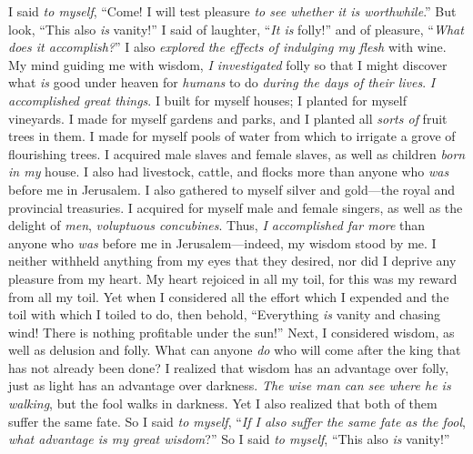\begin{biblechapter} %
 I said \textit{to myself}, “Come! I will test pleasure \textit{to see whether it is worthwhile}.” But look, “This also \textit{is} vanity!”
\verse I said of laughter, “\textit{It is} folly!” and of pleasure, “\textit{What does it accomplish?}”
\verse I also \textit{explored} \textit{the effects of indulging my flesh} with wine. My mind guiding me with wisdom, \textit{I investigated} folly so that I might discover what \textit{is} good under heaven for \textit{humans} to do \textit{during the days of their lives}.
 \textit{I accomplished great things}. I built for myself houses; I planted for myself vineyards.
\verse I made for myself gardens and parks, and I planted all \textit{sorts of} fruit trees in them.
\verse I made for myself pools of water from which to irrigate a grove of flourishing trees.
\verse I acquired male slaves and female slaves, as well as children \textit{born in my} house. I also had livestock, cattle, and flocks more than anyone who \textit{was} before me in Jerusalem.
\verse I also gathered to myself silver and gold—the royal and provincial treasuries. I acquired for myself male and female singers, as well as the delight of \textit{men}, \textit{voluptuous concubines}.
\verse Thus, \textit{I accomplished far more} than anyone who \textit{was} before me in Jerusalem—indeed, my wisdom stood by me.
\verse I neither withheld anything from my eyes that they desired, nor did I deprive any pleasure from my heart. My heart rejoiced in all my toil, for this was my reward from all my toil.
\verse Yet when I considered all the effort which I expended and the toil with which I toiled to do, then behold, “Everything \textit{is} vanity and chasing wind! There is nothing profitable under the sun!”
 Next, I considered wisdom, as well as delusion and folly. What can anyone \textit{do} who will come after the king that has not already been done?
\verse I realized that wisdom has an advantage over folly, just as light has an advantage over darkness.
\verse \textit{The wise man can see where he is walking}, but the fool walks in darkness. Yet I also realized that both of them suffer the same fate.
\verse So I said \textit{to myself}, “\textit{If I also suffer the same fate as the fool}, \textit{what advantage is my great wisdom}?” So I said \textit{to myself}, “This also \textit{is} vanity!”

\end{biblechapter}
